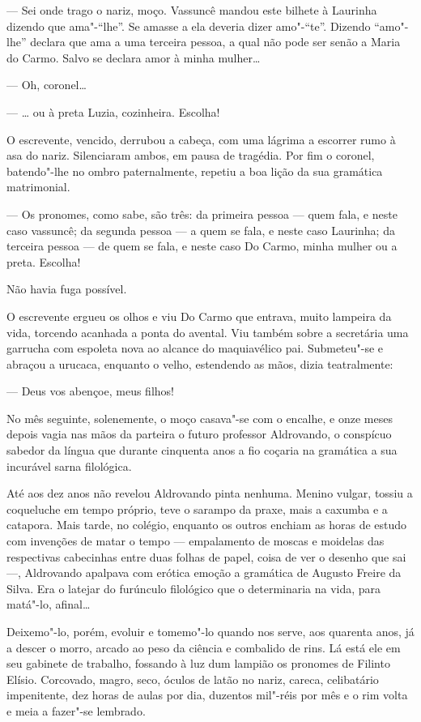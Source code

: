 --- Sei onde trago o nariz, moço. Vassuncê mandou este bilhete à
Laurinha dizendo que ama"-``lhe''. Se amasse a ela deveria dizer
amo"-``te''. Dizendo ``amo"-lhe'' declara que ama a uma terceira pessoa, a
qual não pode ser senão a Maria do Carmo. Salvo se declara amor à minha
mulher\ldots{}

--- Oh, coronel\ldots{}

--- \ldots{} ou à preta Luzia, cozinheira. Escolha!

O escrevente, vencido, derrubou a cabeça, com uma lágrima a escorrer
rumo à asa do nariz. Silenciaram ambos, em pausa de tragédia. Por fim o
coronel, batendo"-lhe no ombro paternalmente, repetiu a boa lição da sua
gramática matrimonial.

--- Os pronomes, como sabe, são três: da primeira pessoa --- quem fala,
e neste caso vassuncê; da segunda pessoa --- a quem se fala, e neste
caso Laurinha; da terceira pessoa --- de quem se fala, e neste caso Do
Carmo, minha mulher ou a preta. Escolha!

Não havia fuga possível.

O escrevente ergueu os olhos e viu Do Carmo que entrava, muito lampeira
da vida, torcendo acanhada a ponta do avental. Viu também sobre a
secretária uma garrucha com espoleta nova ao alcance do maquiavélico
pai. Submeteu"-se e abraçou a urucaca, enquanto o velho, estendendo as
mãos, dizia teatralmente:

--- Deus vos abençoe, meus filhos!

No mês seguinte, solenemente, o moço casava"-se com o encalhe, e onze
meses depois vagia nas mãos da parteira o futuro professor Aldrovando, o
conspícuo sabedor da língua que durante cinquenta anos a fio coçaria na
gramática a sua incurável sarna filológica.

Até aos dez anos não revelou Aldrovando pinta nenhuma. Menino vulgar,
tossiu a coqueluche em tempo próprio, teve o sarampo da praxe, mais a
caxumba e a catapora. Mais tarde, no colégio, enquanto os outros enchiam
as horas de estudo com invenções de matar o tempo --- empalamento de
moscas e moidelas das respectivas cabecinhas entre duas folhas de papel,
coisa de ver o desenho que sai ---, Aldrovando apalpava com erótica
emoção a gramática de Augusto Freire da Silva. Era o latejar do
furúnculo filológico que o determinaria na vida, para matá"-lo, afinal\ldots{}

Deixemo"-lo, porém, evoluir e tomemo"-lo quando nos serve, aos quarenta
anos, já a descer o morro, arcado ao peso da ciência e combalido de
rins. Lá está ele em seu gabinete de trabalho, fossando à luz dum
lampião os pronomes de Filinto Elísio. Corcovado, magro, seco, óculos de
latão no nariz, careca, celibatário impenitente, dez horas de aulas por
dia, duzentos mil"-réis por mês e o rim volta e meia a fazer"-se lembrado.

